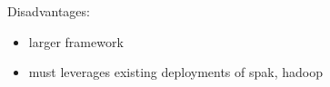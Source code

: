 Disadvantages:

\begin{itemize}

\item
  larger framework
\item
  must leverages existing deployments of spak, hadoop
\end{itemize}


\begin{comment}
\subsection{References}\label{references}

Collaboratories:

\begin{itemize}

\item
  Myers JD, TC Allison, SJ Bittner, BT Didier, M Frenklach, WH Green, YL
  Ho, J Hewson, WS Koegler, CS Lansing, D Leahy, M Lee, R McCoy, M
  Minkoff, S Nijsure, G von Laszewski, D Montoya, L Oluwole, CM
  Pancerella, R Pinzon, W Pitz, LA Rahn, B Ruscic, KL Schuchardt, EG
  Stephan, A Wagner, TL Windus, and C Yang. 2005. ``A Collaborative
  Informatics Infrastructure for Multi-scale Science.'' Cluster
  Computing 8(4):243-253.
\item
  Metadata in the Collaboratory for Multi-Scale Chemical Science Carmen
  Pancerella, John Hewson, Wendy Koegler, David Leahy, Michael Lee,
  Larry Rahn, Christine Yang, James D. Myers, Brett Didier, Renata
  McCoy, Karen Schuchardt, Eric Stephan, Theresa Windus, Kaizar Amin,
  Sandra Bittner, Carina Lansing, Michael Minkoff, Sandeep Nijsure,
  Gregor von Laszewski, Reinhardt Pinzon, Branko Ruscic, Al Wagner,
  Baoshan Wang, William Pitz, Yen-Ling Ho, David Montoya, Lili Xu,
  Thomas C. Allison, William H. Green, Jr., Michael Frenklach
  \url{http://dcpapers.dublincore.org/pubs/article/view/740/736}
\end{itemize}
\end{comment}